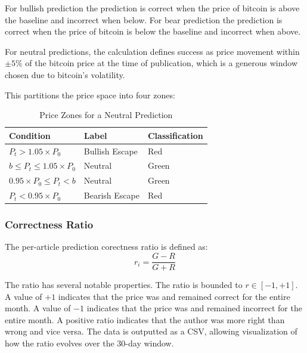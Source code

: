\documentclass[sigconf,screen]{acmart}
\renewcommand{\arraystretch}{1.05}
\begin{document}
For bullish prediction the prediction is correct when the price of bitcoin is above the baseline and incorrect when below. For bear prediction the prediction is correct when the price of bitcoin is below the baseline and incorrect when above.

For neutral predictions, the calculation defines success as price movement within $\pm5\%$ of the bitcoin price at the time of publication, which is a generous window chosen due to bitcoin's volatility.

This partitions the price space into four zones:
\begin{table}[t]
    \centering
    \small
    \setlength{\tabcolsep}{8pt}
    \renewcommand{\arraystretch}{1.15}
    \begin{tabular}{lll}
        \hline
        \textbf{Condition} & \textbf{Label} & \textbf{Classification} \\
        \hline
        $P_t > 1.05 \times P_0$                 & Bullish Escape & Red   \\
        $b \leq P_t \leq 1.05 \times P_0$       & Neutral        & Green \\
        $0.95 \times P_0 \leq P_t < b$          & Neutral        & Green \\
        $P_t < 0.95 \times P_0$                 & Bearish Escape & Red   \\
        \hline
    \end{tabular}
    \caption{Price Zones for a Neutral Prediction}
    \label{tab:zones}
\end{table}

\subsubsection{Correctness Ratio}

The per-article prediction corectness ratio is defined as:
\begin{equation}
r_i = \frac{G - R}{G + R}
\end{equation}

The ratio has several notable properties. The ratio is bounded to $r \in [-1, +1]$. A value of $+1$ indicates that the price was and remained correct for the entire month. A value of $-1$ indicates that the price was and remained incorrect for the entire month. A positive ratio indicates that the author was more right than wrong and vice versa. The data is outputted as a CSV, allowing visualization of how the ratio evolves over the 30-day window.
\end{document}
